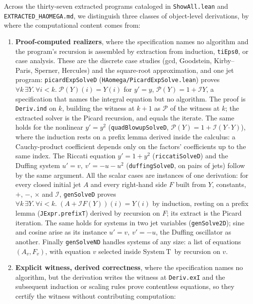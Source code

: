 \documentclass[11pt,a4paper]{article}
\theoremstyle{definition}
\theoremstyle{remark}
\newcommand{\SystemT}{\ensuremath{\mathrm{System\ T}}}
\newcommand{\lean}[1]{\texttt{\nolinkurl{#1}}}
\begin{document}
Across the thirty-seven extracted programs cataloged in \lean{ShowAll.lean} and
\lean{EXTRACTED_HAOMEGA.md}, we distinguish three classes of object-level
derivations, by where the computational content comes from:
\begin{enumerate}
\item \textbf{Proof-computed realizers}, where the specification names no
algorithm and the program's recursion is assembled by extraction from
induction, \lean{tiEps0}, or case analysis. These are the discrete case
studies (gcd, Goodstein, Kirby--Paris, Sperner, Hercules) and the
square-root approximation, and one jet program: \lean{picardExpSolveD}
(\lean{HAomega/PicardExpSolve.lean}) proves
\(\forall k\,\exists Y.\,\forall i < k.\; \mathcal{P}(Y)(i) = Y(i)\) for
\(y' = y\), \(\mathcal{P}(Y) = 1 + \mathcal{I}Y\), a specification that names the
integral equation but no algorithm. The proof is \lean{Deriv.ind} on \(k\),
building the witness at \(k+1\) as \(\mathcal{P}\) of the witness at \(k\);
the extracted solver is the Picard recursion, and equals the iterate.
The same holds for the nonlinear \(y' = y^2\) (\lean{quadBlowupSolveD},
\(\mathcal{P}(Y) = 1 + \mathcal{I}(Y\cdot Y)\)), where the induction rests on a
prefix lemma derived inside the calculus: a Cauchy-product coefficient depends
only on the factors' coefficients up to the same index. The Riccati equation
\(y' = 1 + y^2\) (\lean{riccatiSolveD}) and the Duffing system
\(u' = v,\ v' = -u - u^2\) (\lean{duffingSolveD}, on pairs of jets) follow by
the same argument.
All the scalar cases are instances of one derivation: for every closed initial
jet \(A\) and every right-hand side \(F\) built from \(Y\), constants,
\(+\), \(-\), \(\times\) and \(\mathcal{I}\), \lean{genSolveD} proves
\(\forall k\,\exists Y.\,\forall i < k.\; (A + \mathcal{I}F(Y))(i) = Y(i)\)
by induction, resting on a prefix lemma (\lean{JExpr.prefixT}) derived by
recursion on \(F\); its extract is the Picard iteration. The same holds
for systems in two jet variables (\lean{genSolve2D}); sine and cosine arise as
its instance \(u' = v,\ v' = -u\), the Duffing oscillator as another. Finally
\lean{genSolveND} handles systems of any size: a list of equations
\((A_v, F_v)\), with equation \(v\) selected inside \SystemT\ by recursion on
\(v\).
\item \textbf{Explicit witness, derived correctness}, where the specification
names no algorithm, but the derivation writes the witness at \lean{Deriv.exI}
and the subsequent induction or scaling rules prove contentless equations, so
they certify the witness without contributing computation:

\end{enumerate}
\end{document}
